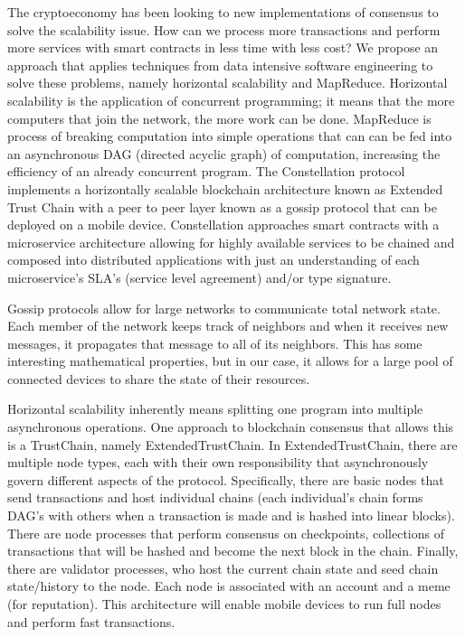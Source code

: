 \documentclass{article}
\begin{document}
The cryptoeconomy has been looking to new implementations of consensus to solve the scalability issue. How can we process more transactions and perform more services with smart contracts in less time with less cost? We propose an approach that applies techniques from data intensive software engineering to solve these problems, namely horizontal scalability and MapReduce. Horizontal scalability is the application of concurrent programming; it means that the more computers that join the network, the more work can be done. MapReduce is process of breaking computation into simple operations that can can be fed into an asynchronous DAG (directed acyclic graph) of computation, increasing the efficiency of an already concurrent program. The Constellation protocol implements a horizontally scalable blockchain architecture known as Extended Trust Chain with a peer to peer layer known as a gossip protocol that can be deployed on a mobile device. Constellation approaches smart contracts with a microservice architecture allowing for highly available services to be chained and composed into distributed applications with just an understanding of each microservice's SLA's (service level agreement) and/or type signature.

Gossip protocols allow for large networks to communicate total network state. Each member of the network keeps track of neighbors and when it receives new messages, it propagates that message to all of its neighbors. This has some interesting mathematical properties, but in our case, it allows for a large pool of connected devices to share the state of their resources.

Horizontal scalability inherently means splitting one program into multiple asynchronous operations. One approach to blockchain consensus that allows this is a TrustChain, namely ExtendedTrustChain. In ExtendedTrustChain, there are multiple node types, each with their own responsibility that asynchronously govern different aspects of the protocol. Specifically, there are basic nodes that send transactions and host individual chains (each individual's chain forms DAG's with others when a transaction is made and is hashed into linear blocks). There are node processes that perform consensus on checkpoints, collections of transactions that will be hashed and become the next block in the chain. Finally, there are validator processes, who host the current chain state and seed chain state/history to the node. Each node is associated with an account and a meme (for reputation). This architecture will enable mobile devices to run full nodes and perform fast transactions.
\end{document}

